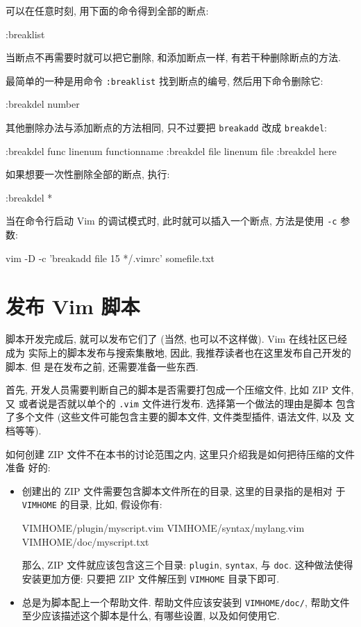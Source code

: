 可以在任意时刻, 用下面的命令得到全部的断点:
\begin{vimcode}
:breaklist
\end{vimcode}

当断点不再需要时就可以把它删除, 和添加断点一样, 有若干种删除断点的方法.

最简单的一种是用命令 \texttt{:breaklist} 找到断点的编号, 然后用下命令删除它:
\begin{vimcode}
:breakdel number
\end{vimcode}

其他删除办法与添加断点的方法相同, 只不过要把 \texttt{breakadd} 改成
\texttt{breakdel}:
\begin{vimcode}
:breakdel func linenum functionname
:breakdel file linenum file
:breakdel here
\end{vimcode}

如果想要一次性删除全部的断点, 执行:
\begin{vimcode}
:breakdel *
\end{vimcode}

\begin{warning}
    当在命令行启动 Vim 的调试模式时, 此时就可以插入一个断点, 方法是使用
    \texttt{-c} 参数:
\begin{vimcode}
vim -D -c 'breakadd file 15 */.vimrc' somefile.txt
\end{vimcode}
\end{warning}

\section{发布 Vim 脚本}
\label{sec:distributing_vim_scripts}

脚本开发完成后, 就可以发布它们了 (当然, 也可以不这样做). Vim 在线社区已经成为
实际上的脚本发布与搜索集散地, 因此, 我推荐读者也在这里发布自己开发的脚本. 但
是在发布之前, 还需要准备一些东西.

首先, 开发人员需要判断自己的脚本是否需要打包成一个压缩文件, 比如 ZIP 文件, 又
或者说是否就以单个的 \texttt{.vim} 文件进行发布. 选择第一个做法的理由是脚本
包含了多个文件 (这些文件可能包含主要的脚本文件, 文件类型插件, 语法文件, 以及
文档等等).

如何创建 ZIP 文件不在本书的讨论范围之内, 这里只介绍我是如何把待压缩的文件准备
好的:
\begin{itemize}
    \item 创建出的 ZIP 文件需要包含脚本文件所在的目录, 这里的目录指的是相对
        于 \texttt{VIMHOME} 的目录, 比如, 假设你有:
\begin{vimcode}
VIMHOME/plugin/myscript.vim
VIMHOME/syntax/mylang.vim
VIMHOME/doc/myscript.txt
\end{vimcode}
那么, ZIP 文件就应该包含这三个目录: \texttt{plugin}, \texttt{syntax}, 与
\texttt{doc}. 这种做法使得安装更加方便: 只要把 ZIP 文件解压到 \texttt{VIMHOME}
目录下即可.

    \item 总是为脚本配上一个帮助文件. 帮助文件应该安装到 \texttt{VIMHOME/doc/},
        帮助文件至少应该描述这个脚本是什么, 有哪些设置, 以及如何使用它.
\end{itemize}

